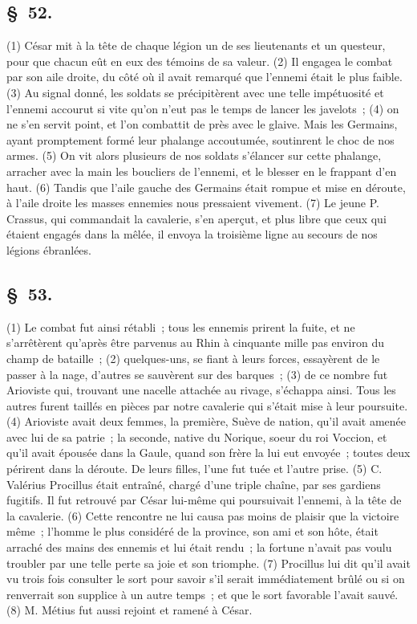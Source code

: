 \documentclass[french,twoside]{book} %
\begin{document}
\subsection[{§ 52.}]{ \textsc{§ 52.} }
\noindent (1) César mit à la tête de chaque légion un de ses lieutenants et un questeur, pour que chacun eût en eux des témoins de sa valeur. (2) Il engagea le combat par son aile droite, du côté où il avait remarqué que l’ennemi était le plus faible. (3) Au signal donné, les soldats se précipitèrent avec une telle impétuosité et l’ennemi accourut si vite qu’on n’eut pas le temps de lancer les javelots ; (4) on ne s’en servit point, et l’on combattit de près avec le glaive. Mais les Germains, ayant promptement formé leur phalange accoutumée, soutinrent le choc de nos armes. (5) On vit alors plusieurs de nos soldats s’élancer sur cette phalange, arracher avec la main les boucliers de l’ennemi, et le blesser en le frappant d’en haut. (6) Tandis que l’aile gauche des Germains était rompue et mise en déroute, à l’aile droite les masses ennemies nous pressaient vivement. (7) Le jeune P. Crassus, qui commandait la cavalerie, s’en aperçut, et plus libre que ceux qui étaient engagés dans la mêlée, il envoya la troisième ligne au secours de nos légions ébranlées.
\subsection[{§ 53.}]{ \textsc{§ 53.} }
\noindent (1) Le combat fut ainsi rétabli ; tous les ennemis prirent la fuite, et ne s’arrêtèrent qu’après être parvenus au Rhin à cinquante mille pas environ du champ de bataille ; (2) quelques-uns, se fiant à leurs forces, essayèrent de le passer à la nage, d’autres se sauvèrent sur des barques ; (3) de ce nombre fut Arioviste qui, trouvant une nacelle attachée au rivage, s’échappa ainsi. Tous les autres furent taillés en pièces par notre cavalerie qui s’était mise à leur poursuite. (4) Arioviste avait deux femmes, la première, Suève de nation, qu’il avait amenée avec lui de sa patrie ; la seconde, native du Norique, soeur du roi Voccion, et qu’il avait épousée dans la Gaule, quand son frère la lui eut envoyée ; toutes deux périrent dans la déroute. De leurs filles, l’une fut tuée et l’autre prise. (5) C. Valérius Procillus était entraîné, chargé d’une triple chaîne, par ses gardiens fugitifs. Il fut retrouvé par César lui-même qui poursuivait l’ennemi, à la tête de la cavalerie. (6) Cette rencontre ne lui causa pas moins de plaisir que la victoire même ; l’homme le plus considéré de la province, son ami et son hôte, était arraché des mains des ennemis et lui était rendu ; la fortune n’avait pas voulu troubler par une telle perte sa joie et son triomphe. (7) Procillus lui dit qu’il avait vu trois fois consulter le sort pour savoir s’il serait immédiatement brûlé ou si on renverrait son supplice à un autre temps ; et que le sort favorable l’avait sauvé. (8) M. Métius fut aussi rejoint et ramené à César.
\end{document}
